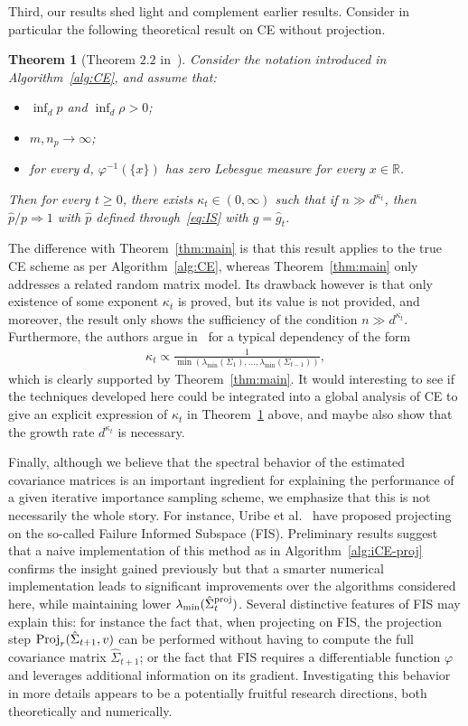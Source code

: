 \documentclass[]{article}
\newcommand{\nfin}{{n_p}}
\newcommand{\npar}{{n}}
\newcommand{\R}{\mathbb{R}}
\newcommand{\Proj}{{\textnormal{\textrm{Proj}}}} %
\newcommand{\proj}{{\textnormal{\textrm{proj}}}} %
\theoremstyle{plain}
\newtheorem{thm}[lemma]{Theorem}
\theoremstyle{definition}
\begin{document}
Third, our results shed light and complement earlier results. Consider in particular the following theoretical result on CE without projection.
% 
\begin{thm} [Theorem $2.2$ in~\cite{beh2023insight}] \label{thm:CE}
	Consider the notation introduced in Algorithm~\ref{alg:CE}, and assume that:
	\begin{itemize}
		\item $\inf_d p$ and $\inf_d \rho > 0$;
		\item $m, \nfin \to \infty$;
		\item for every $d$, $\varphi^{-1}(\{x\})$ has zero Lebesgue measure for every $x \in \R$.
	\end{itemize}
	Then for every $t \geq 0$, there exists $\kappa_t \in (0,\infty)$ such that if $\npar \gg d^{\kappa_t}$, then $\hat p / p \Rightarrow 1$ with $\hat p$ defined through~\eqref{eq:IS} with $g = \hat g_t$.
\end{thm}
% 
\noindent The difference with Theorem~\ref{thm:main} is that this result applies to the true CE scheme as per Algorithm~\ref{alg:CE}, whereas Theorem~\ref{thm:main} only addresses a related random matrix model. Its drawback however is that only existence of some exponent $\kappa_t$ is proved, but its value is not provided, and moreover, the result only shows the sufficiency of the condition $n \gg d^{\kappa_t}$. Furthermore, the authors argue in~\cite{beh2023insight} for a typical dependency of the form
\begin{align} \label{eq:kappa-conjecture}
	\kappa_t \propto \frac{1}{\displaystyle \min \left(\lambda_{\min}(\Sigma_1), \dots, \lambda_{\min}(\Sigma_{t-1}) \right)},
\end{align}
which is clearly supported by Theorem~\ref{thm:main}. It would interesting to see if the techniques developed here could be integrated into a global analysis of CE to give an explicit expression of $\kappa_t$ in Theorem~\ref{thm:CE} above, and maybe also show that the growth rate $d^{\kappa_t}$ is necessary.

Finally, although we believe that the spectral behavior of the estimated covariance matrices is an important ingredient for explaining the performance of a given iterative importance sampling scheme, we emphasize that this is not necessarily the whole story. For instance, Uribe et al.~\cite{uribe2021} have proposed projecting on the so-called Failure Informed Subspace (FIS). Preliminary results suggest that a naive implementation of this method as in Algorithm~\ref{alg:iCE-proj} confirms the insight gained previously but that a smarter numerical implementation leads to significant improvements over the algorithms considered here, while maintaining lower $\lambda_{\min}(\hat \Sigma^\proj_t)$. Several distinctive features of FIS may explain this: for instance the fact that, when projecting on FIS, the projection step $\Proj_r(\hat \Sigma_{t+1}, v)$ can be performed without having to compute the full covariance matrix $\hat \Sigma_{t+1}$; or the fact that FIS requires a differentiable function $\varphi$ and leverages additional information on its gradient. Investigating this behavior in more details appears to be a potentially fruitful research directions, both theoretically and numerically.
\end{document}
